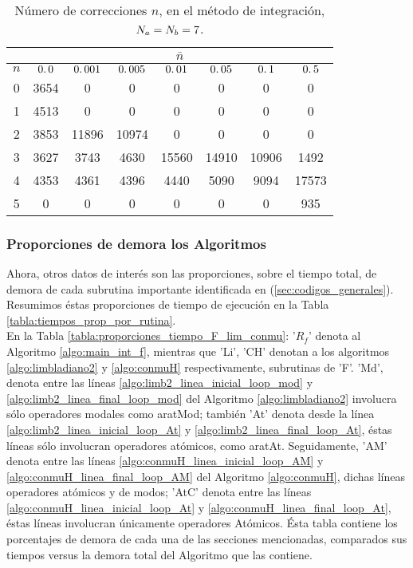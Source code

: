 \begin{table}[h]
 \centering
\begin{tabular}{|c|c|c|c|c|c|c|c|}
\hline &\multicolumn{7}{|c|}{$\bar{n}$}\\
\hline $n$ & $0\ldotp0$ &$0\ldotp001$ &$0\ldotp005$ &$0\ldotp01$ &$0\ldotp05$ &$0\ldotp1$ &$0\ldotp5$\\
\hline 0 & 3654 & 0 & 0 & 0 & 0 &0 &0 \\
\hline 1 & 4513 & 0 & 0 & 0 & 0 &0 &0 \\
\hline 2 & 3853 & 11896 & 10974 & 0 & 0 &0 &0 \\
\hline 3 & 3627 & 3743 & 4630 & 15560 & 14910 &10906 &1492\\
\hline 4 & 4353 & 4361 & 4396 & 4440 & 5090 &9094 &17573 \\
\hline 5 & 0 & 0 & 0 & 0 & 0 &0 &935 \\
\hline
\end{tabular}\caption{N\'umero de correcciones $n$, en el m\'etodo de integraci\'on, $N_a=N_b=7$.}\label{tabla:numero_correcciones}
\end{table}
\clearpage
\subsubsection{Proporciones de demora los Algoritmos}\label{sec:prop_demora_algoritmos}

\qquad Ahora, otros datos de inter\'es son las proporciones, sobre el tiempo total, de demora de cada subrutina importante identificada en (\ref{sec:codigos_generales}). Resumimos \'estas proporciones de tiempo de ejecuci\'on en la Tabla \ref{tabla:tiempos_prop_por_rutina}.\\


\clearpage
\qquad En la Tabla \ref{tabla:proporciones_tiempo_F_lim_conmu}: '$R_f$' denota al Algoritmo \ref{algo:main_int_f}, mientras que 'Li', 'CH' denotan a los algoritmos \ref{algo:limbladiano2} y \ref{algo:conmuH} respectivamente, subrutinas de 'F'. 'Md', denota entre las l\'ineas \ref{algo:limb2_linea_inicial_loop_mod} y \ref{algo:limb2_linea_final_loop_mod} del Algoritmo \ref{algo:limbladiano2} involucra s\'olo operadores modales como aratMod; tambi\'en 'At' denota desde la l\'inea \ref{algo:limb2_linea_inicial_loop_At} y \ref{algo:limb2_linea_final_loop_At}, \'estas l\'ineas s\'olo involucran operadores at\'omicos, como aratAt. Seguidamente, 'AM' denota entre las l\'ineas \ref{algo:conmuH_linea_inicial_loop_AM} y \ref{algo:conmuH_linea_final_loop_AM} del Algoritmo \ref{algo:conmuH}, dichas l\'ineas operadores at\'omicos y de modos; 'AtC' denota entre las l\'ineas \ref{algo:conmuH_linea_inicial_loop_At} y \ref{algo:conmuH_linea_final_loop_At}, \'estas l\'ineas involucran \'unicamente operadores At\'omicos. \'Esta tabla contiene los porcentajes de demora de cada una de las secciones mencionadas, comparados sus tiempos versus la demora total del Algoritmo que las contiene.\\

